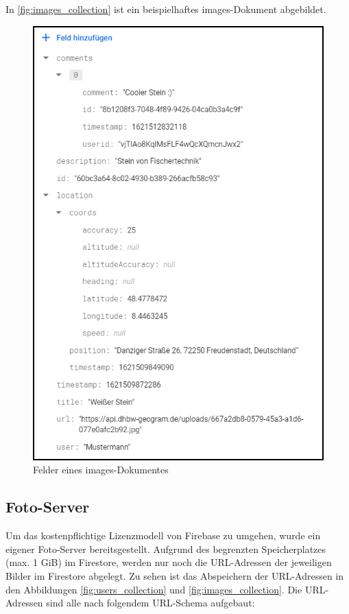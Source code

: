 In \autoref{fig:images_collection} ist ein beispielhaftes images-Dokument abgebildet.

\begin{figure}[H]
    \centering
    \includegraphics[width=.7\linewidth]{images/collection_images.png}
    \caption{Felder eines \glqq images\grqq{}-Dokumentes}
    \label{fig:images_collection}
\end{figure}

\subsection{Foto-Server\label{sup3.2.3:Unterpunkt-3}}

Um das kostenpflichtige Lizenzmodell von Firebase zu umgehen, wurde ein eigener Foto-Server bereitsgestellt. Aufgrund des begrenzten Speicherplatzes (max. 1 GiB) im Firestore, werden nur noch die URL-Adressen der jeweiligen Bilder im Firestore abgelegt. Zu sehen ist das Abspeichern der URL-Adressen in den Abbildungen \autoref{fig:users_collection} und \autoref{fig:images_collection}. Die URL-Adressen sind alle nach folgendem URL-Schema aufgebaut:

\noindent{}

